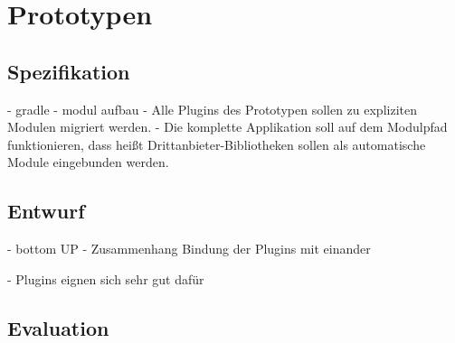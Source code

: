 \chapter{Prototypen} 


\section{Spezifikation}
- gradle 
- modul aufbau 
- Alle Plugins des Prototypen sollen zu expliziten Modulen migriert werden.
- Die komplette Applikation soll auf dem Modulpfad funktionieren, dass heißt Drittanbieter-Bibliotheken sollen als automatische Module eingebunden werden.

\section{Entwurf}
- bottom UP 
- Zusammenhang  Bindung der Plugins mit einander 

- Plugins eignen sich sehr gut dafür 


\section{Evaluation}
